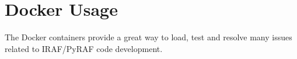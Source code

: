 
\renewcommand{\footerfilename}{Docker.tex}

\section{Docker Usage}


The Docker containers provide a great way to load, test and resolve
many issues related to IRAF/PyRAF code development.

